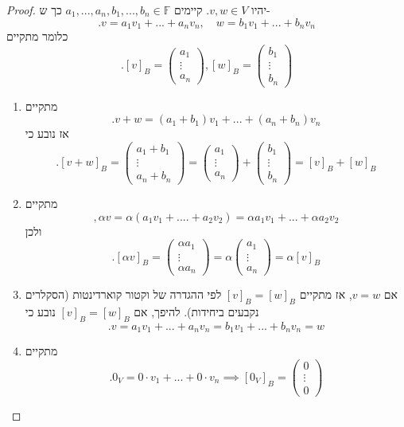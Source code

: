 \documentclass[12pt]{report}
\theoremstyle{plain}
\theoremstyle{definition}
\newcommand{\F}{\mathbb{F}}
\newcommand{\0}{\mathbf{0}}
\begin{document}
\begin{proof}
יהיו
$v,w\in V$. 
קיימים
$a_1,...,a_n,b_1,...,b_n\in\F$
כך ש-
$$
.v=a_1v_1+...+a_nv_n,\quad w=b_1v_1+...+b_nv_n
$$
כלומר מתקיים
$$
.[v]_B=\begin{pmatrix}
a_1 \\
\vdots \\
a_n
\end{pmatrix},[w]_B=\begin{pmatrix}
b_1 \\
\vdots \\
b_n
\end{pmatrix}
$$

\begin{enumerate}[label=\alph*.]
\item 
מתקיים
$$
.v+w=(a_1+b_1)v_1+...+(a_n+b_n)v_n
$$
אז נובע כי
$$
.[v+w]_B=\begin{pmatrix}
a_1+b_1 \\
\vdots \\
a_n+b_n
\end{pmatrix}=\begin{pmatrix}
a_1 \\
\vdots \\
a_n
\end{pmatrix}+\begin{pmatrix}
b_1 \\
\vdots \\
b_n
\end{pmatrix}=[v]_B+[w]_B
$$


\item 
מתקיים
$$
,\alpha v=\alpha(a_1v_1+....+a_2v_2)=\alpha a_1v_1+...+\alpha a_2v_2
$$
ולכן
$$
.[\alpha v]_B=\begin{pmatrix}
\alpha a_1 \\
\vdots \\
\alpha a_n
\end{pmatrix}=\alpha\begin{pmatrix}
a_1 \\
\vdots \\
a_n
\end{pmatrix}=\alpha[v]_B
$$


\item 
אם
$v=w$,
אז מתקיים
$[v]_B=[w]_B$
לפי ההגדרה של וקטור קוארדינטות (הסקלרים נקבעים ביחידות).
להיפך, אם
$[v]_B=[w]_B$ 
נובע כי
$$
.v=a_1v_1+...+a_nv_n=b_1v_1+...+b_nv_n=w
$$


\item 
מתקיים
$$
.0_V=0\cdot v_1+...+0\cdot v_n \implies [0_V]_B=\begin{pmatrix}
0 \\
\vdots \\
0
\end{pmatrix}
$$


\end{enumerate}
\end{proof}
\end{document}
